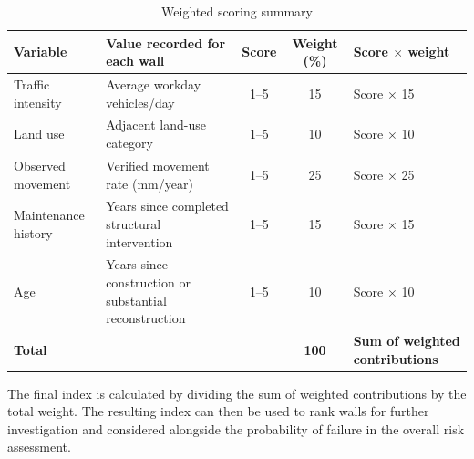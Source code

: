 \begin{table}[htbp]
    \centering
    \caption{Weighted scoring summary}
    \vspace{2mm}
    \begin{tabularx}{\textwidth}{X X c c X}
        \toprule
        \textbf{Variable} & \textbf{Value recorded for each wall} & \textbf{Score} & \textbf{Weight (\%)} & \textbf{Score $\times$ weight} \\
        \midrule
        Traffic intensity & Average workday vehicles/day & 1–5 & 15 & Score $\times$ 15 \\
        Land use & Adjacent land-use category & 1–5 & 10 & Score $\times$ 10 \\
        Observed movement & Verified movement rate (mm/year) & 1–5 & 25 & Score $\times$ 25 \\
        Maintenance history & Years since completed structural intervention & 1–5 & 15 & Score $\times$ 15 \\
        Age & Years since construction or substantial reconstruction & 1–5 & 10 & Score $\times$ 10 \\
        \midrule
        \textbf{Total} & & & \textbf{100} & \textbf{Sum of weighted contributions} \\
        \bottomrule
    \end{tabularx}
\end{table}

The final index is calculated by dividing the sum of weighted contributions by the total weight. The resulting index can then be used to rank walls for further investigation and considered alongside the probability of failure in the overall risk assessment.


